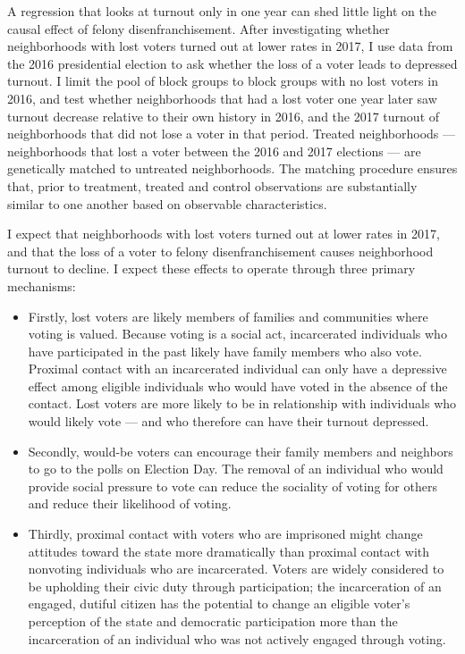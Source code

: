 \documentclass[
  12pt,
]{article}
\begin{document}
A regression that looks at turnout only in one year can shed little light on the causal effect of felony disenfranchisement. After investigating whether neighborhoods with lost voters turned out at lower rates in 2017, I use data from the 2016 presidential election to ask whether the loss of a voter leads to depressed turnout. I limit the pool of block groups to block groups with no lost voters in 2016, and test whether neighborhoods that had a lost voter one year later saw turnout decrease relative to their own history in 2016, and the 2017 turnout of neighborhoods that did not lose a voter in that period. Treated neighborhoods --- neighborhoods that lost a voter between the 2016 and 2017 elections --- are genetically matched to untreated neighborhoods. The matching procedure ensures that, prior to treatment, treated and control observations are substantially similar to one another based on observable characteristics.

I expect that neighborhoods with lost voters turned out at lower rates in 2017, and that the loss of a voter to felony disenfranchisement causes neighborhood turnout to decline. I expect these effects to operate through three primary mechanisms:

\begin{itemize}
\item
  Firstly, lost voters are likely members of families and communities where voting is valued. Because voting is a social act, incarcerated individuals who have participated in the past likely have family members who also vote. Proximal contact with an incarcerated individual can only have a depressive effect among eligible individuals who would have voted in the absence of the contact. Lost voters are more likely to be in relationship with individuals who would likely vote --- and who therefore can have their turnout depressed.
\item
  Secondly, would-be voters can encourage their family members and neighbors to go to the polls on Election Day. The removal of an individual who would provide social pressure to vote can reduce the sociality of voting for others and reduce their likelihood of voting.
\item
  Thirdly, proximal contact with voters who are imprisoned might change attitudes toward the state more dramatically than proximal contact with nonvoting individuals who are incarcerated. Voters are widely considered to be upholding their civic duty through participation; the incarceration of an engaged, dutiful citizen has the potential to change an eligible voter's perception of the state and democratic participation more than the incarceration of an individual who was not actively engaged through voting.
\end{itemize}
\end{document}
